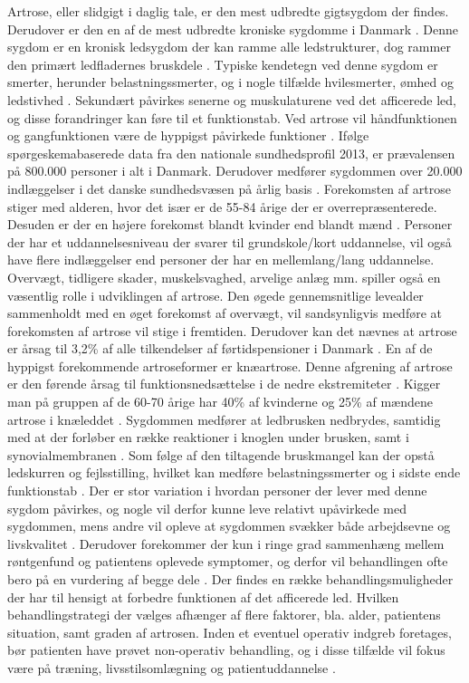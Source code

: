 Artrose, eller slidgigt i daglig tale, er den mest udbredte gigtsygdom der findes. Derudover er den en af de mest udbredte kroniske sygdomme i Danmark \citep{sygdom}. Denne sygdom er en kronisk ledsygdom der kan ramme alle ledstrukturer, dog rammer den primært ledfladernes bruskdele \citep{schroder}. 
Typiske kendetegn ved denne sygdom er smerter, herunder belastningssmerter, og i nogle tilfælde hvilesmerter, ømhed og ledstivhed \citep{schroder}. Sekundært påvirkes senerne og muskulaturene ved det afficerede led, og disse forandringer kan føre til et funktionstab. Ved artrose vil håndfunktionen og gangfunktionen være de hyppigst påvirkede funktioner \citep{schroder}. 
Ifølge spørgeskemabaserede data fra den nationale sundhedsprofil 2013, er prævalensen på 800.000 personer i alt i Danmark. Derudover medfører sygdommen  over 20.000 indlæggelser i det danske sundhedsvæsen på årlig basis \cite{sygdom}. Forekomsten af artrose stiger med alderen, hvor det især er de 55-84 årige der er overrepræsenterede. Desuden er der en højere forekomst blandt kvinder end blandt mænd \cite{sygdom}. 
Personer der har et uddannelsesniveau der svarer til grundskole/kort uddannelse, vil også have flere indlæggelser end personer der har en mellemlang/lang uddannelse. Overvægt, tidligere skader, muskelsvaghed, arvelige anlæg mm. spiller også en væsentlig rolle i udviklingen af artrose. Den øgede gennemsnitlige levealder sammenholdt med en øget forekomst af overvægt, vil sandsynligvis medføre at  forekomsten af artrose vil stige i fremtiden. Derudover kan det nævnes at artrose er årsag til 3,2\% af alle tilkendelser af førtidspensioner i Danmark \cite{sygdom}.
En af de hyppigst forekommende artroseformer er knæartrose. Denne afgrening af artrose er den førende årsag til funktionsnedsættelse i de nedre ekstremiteter \citep{johnson2014}. Kigger man på gruppen af de 60-70 årige har 40\% af kvinderne og 25\% af mændene artrose i knæleddet \citep{schroder}.
Sygdommen medfører at ledbrusken nedbrydes, samtidig med at der forløber en række reaktioner i knoglen under brusken, samt i synovialmembranen \citep{brostrom2012}.
 Som følge af den tiltagende bruskmangel kan der opstå ledskurren og fejlsstilling, hvilket kan medføre belastningssmerter og i sidste ende funktionstab \cite{ugeskrift2011}.  
Der er stor variation i hvordan personer der lever med denne sygdom påvirkes, og nogle vil derfor kunne leve relativt upåvirkede med sygdommen, mens andre vil opleve at sygdommen svækker både arbejdsevne og livskvalitet \cite{sygdom}. Derudover forekommer der kun i ringe grad sammenhæng mellem røntgenfund og patientens oplevede symptomer, og derfor vil behandlingen ofte bero på en vurdering af begge dele \citep{ugeskrift2011}. Der findes en række behandlingsmuligheder der har til hensigt at forbedre funktionen af det afficerede led. Hvilken behandlingstrategi der vælges afhænger af flere faktorer, bla.  alder, patientens situation, samt graden af artrosen. Inden et eventuel operativ indgreb foretages, bør patienten have prøvet non-operativ behandling, og i disse tilfælde vil fokus være på træning, livsstilsomlægning og patientuddannelse \citep{schroder}.
